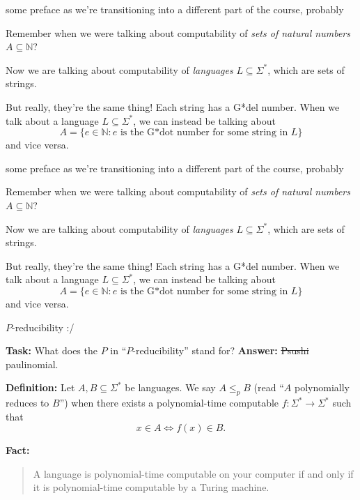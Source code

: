 \documentclass{beamer}
\begin{document}
\begin{frame}{some preface as we're transitioning into a different part of the course, probably} 

Remember when we were talking about computability of \textit{sets of natural numbers} $A \subseteq \mathbb N$?

\vspace{2mm}

Now we are talking about computability of \textit{languages} $L \subseteq \Sigma^*$, which are sets of strings. 

\vspace{2mm}

But really, they're the same thing! Each string has a G*del number. When we talk about a language $L \subseteq \Sigma^*$, we can instead be talking about
$$A = \{e \in \mathbb N: \text{$e$ is the G*dot number for some string in $L$}\}$$
and vice versa.

\end{frame}

\begin{frame}{some preface as we're transitioning into a different part of the course, probably} 

Remember when we were talking about computability of \textit{sets of natural numbers} $A \subseteq \mathbb N$?

\vspace{2mm}

Now we are talking about computability of \textit{languages} $L \subseteq \Sigma^*$, which are sets of strings. 

\vspace{2mm}

But really, they're the same thing! Each string has a G*del number. When we talk about a language $L \subseteq \Sigma^*$, we can instead be talking about
$$A = \{e \in \mathbb N: \text{$e$ is the G*dot number for some string in $L$}\}$$
and vice versa.

\end{frame}

\begin{frame}{$P$-reducibility :/} 

\textbf{Task:} What does the $P$ in ``$P$-reducibility'' stand for?
\textbf{Answer:} \sout{Psushi} paulinomial.

\vspace{4mm}

\textbf{Definition:} Let $A, B \subseteq \Sigma^*$ be languages. We say $A \leq_p B$ (read ``$A$ polynomially reduces to $B$'') when there exists a polynomial-time computable $f: \Sigma^* \to \Sigma^*$ such that
$$x \in A \Leftrightarrow f(x) \in B.$$

\textbf{Fact:}
\begin{quote}
A language is polynomial-time computable on your computer if and only if it is polynomial-time computable by a Turing machine.

\end{quote}
\end{frame}
\end{document}
